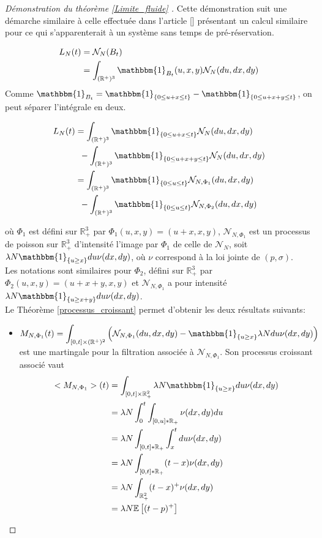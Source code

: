 \documentclass[12pt,a4paper]{article}
\newcommand{\E}[1]{\mathbb{E}\left[ #1 \right]}
\newcommand{\R}{\mathbb{R}}
\newcommand{\1}[1]{\mathbbm{1}_{\{#1\}} }
\theoremstyle{definition}
\begin{document}
{\begin{proof}[Démonstration du théorème \ref{Limite_fluide} ]

Cette démonstration suit une démarche similaire à  celle effectuée dans l'article [] présentant un calcul similaire pour ce qui s'apparenterait à un système sans temps de pré-réservation.


\begin{align*}
L_N(t) &=  \mathcal{N}_N(B_t)\\
&= \int_{(\R^+)^3} \mathbbm{1}_{B_t}(u,x,y) \mathcal{N}_N(du,dx,dy)
\end{align*}
Comme $\mathbbm{1}_{B_t} = \1{0\leq u+x \leq t} - \1{0\leq u+x+y \leq t}$, on peut séparer l'intégrale en deux.


\begin{align*}
L_N(t) &= \int_{(\R^+)^3} \1{0\leq u+x \leq t} \mathcal{N}_N(du,dx,dy)\\ &\,\,\,-
\int_{(\R^+)^3} \1{0\leq u+x+y \leq t} \mathcal{N}_N(du,dx,dy)\\
&= \int_{(\R^+)^3} \1{0\leq u \leq t} \mathcal{N}_{N,\Phi_1}(du,dx,dy)\\ &\,\,\,-
\int_{(\R^+)^3} \1{0\leq u \leq t} \mathcal{N}_{N,\Phi_2}(du,dx,dy)\\
\end{align*}

où $\Phi_1$ est défini sur $\R_+^3$ par $\Phi_1(u,x,y) = (u+x,x,y)$, $\mathcal{N}_{N,\Phi_1}$  est un processus de poisson sur $\R_+^3$ d'intensité l'image par $\Phi_1$ de celle de $\mathcal{N}_N$, soit $\lambda N \1{u\geq x}du\nu(dx,dy)$, où $\nu$ correspond à la loi jointe de $(p,\sigma)$.\\
Les notations sont similaires pour $\Phi_2$, défini sur $\R_+^3$ par $\Phi_2(u,x,y) = (u+x+y,x,y)$ et $\mathcal{N}_{N,\Phi_1}$ a pour intensité $\lambda N \1{u\geq x+y}du\nu(dx,dy)$.\\


Le Théorème \ref{processus_croissant} permet d'obtenir les deux résultats suivants:


\begin{itemize}

\item $\displaystyle M_{N,\Phi_1}(t) = \int_{[0,t]\times (\R^+)^2}  \left(\mathcal{N}_{N,\Phi_1}(du,dx,dy)-\1{u\geq x}\lambda N du \nu(dx,dy)\right)$ est une martingale pour la filtration associée à $\mathcal{N}_{N,\Phi_1}$. Son processus croissant associé vaut\\
  
\begin{align*}
<M_{N,\Phi_1}>(t) &= \int_{[0,t]\times \R_+^2}\lambda N \1{u\geq x}du\nu(dx,dy)\\
&= \lambda N \int_0^t\int_{[0,u]*\R_+}\nu(dx,dy) du\\
&= \lambda N \int_{[0,t]*\R_+}\int_x^t du \nu(dx,dy)\\
&= \lambda N \int_{[0,t]*\R_+}(t-x) \nu(dx,dy)\\
&= \lambda N \int_{\R_+^2}(t-x)^+ \nu(dx,dy)\\
&= \lambda N \E{(t-p)^+}
\end{align*}  
  

\end{itemize}
\end{proof}}
\end{document}
